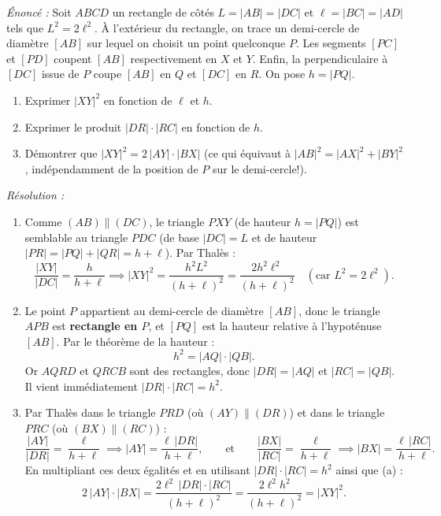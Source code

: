 \begin{exemple}
\emph{Énoncé :} Soit $ABCD$ un rectangle de côtés $L = |AB| = |DC|$ et $\ell = |BC| = |AD|$ tels que $L^2 = 2\ell^2$. À l'extérieur du rectangle, on trace un demi-cercle de diamètre $[AB]$ sur lequel on choisit un point quelconque $P$. Les segments $[PC]$ et $[PD]$ coupent $[AB]$ respectivement en $X$ et $Y$. Enfin, la perpendiculaire à $[DC]$ issue de $P$ coupe $[AB]$ en $Q$ et $[DC]$ en $R$. On pose $h = |PQ|$.
\begin{enumerate}[label=(\alph*)]
    \item Exprimer $|XY|^2$ en fonction de $\ell$ et $h$.
    \item Exprimer le produit $|DR| \cdot |RC|$ en fonction de $h$.
    \item Démontrer que $|XY|^2 = 2\,|AY|\cdot|BX|$ (ce qui équivaut à $|AB|^2 = |AX|^2 + |BY|^2$, indépendamment de la position de $P$ sur le demi-cercle!).
\end{enumerate}
\emph{Résolution :}
\begin{enumerate}[label=(\alph*)]
    \item Comme $(AB) \parallel (DC)$, le triangle $PXY$ (de hauteur $h = |PQ|$) est semblable au triangle $PDC$ (de base $|DC| = L$ et de hauteur $|PR| = |PQ| + |QR| = h + \ell$). Par Thalès :
    \[
        \frac{|XY|}{|DC|} = \frac{h}{h+\ell} \implies |XY|^2 = \frac{h^2 L^2}{(h+\ell)^2} = \boxed{\frac{2h^2\ell^2}{(h+\ell)^2}} \quad (\text{car } L^2 = 2\ell^2).
    \]
    \item Le point $P$ appartient au demi-cercle de diamètre $[AB]$, donc le triangle $APB$ est \textbf{rectangle en $P$}, et $[PQ]$ est la hauteur relative à l'hypoténuse $[AB]$. Par le théorème de la hauteur :
    \[
        h^2 = |AQ| \cdot |QB|.
    \]
    Or $AQRD$ et $QRCB$ sont des rectangles, donc $|DR| = |AQ|$ et $|RC| = |QB|$. Il vient immédiatement $|DR| \cdot |RC| = \boxed{h^2}$.
    \item Par Thalès dans le triangle $PRD$ (où $(AY) \parallel (DR)$) et dans le triangle $PRC$ (où $(BX) \parallel (RC)$) :
    \[
        \frac{|AY|}{|DR|} = \frac{\ell}{h+\ell} \implies |AY| = \frac{\ell\,|DR|}{h+\ell}, \qquad \text{et} \qquad \frac{|BX|}{|RC|} = \frac{\ell}{h+\ell} \implies |BX| = \frac{\ell\,|RC|}{h+\ell}.
    \]
    En multipliant ces deux égalités et en utilisant $|DR|\cdot|RC| = h^2$ ainsi que (a) :
    \[
        2\,|AY|\cdot|BX| = \frac{2\ell^2\,|DR|\cdot|RC|}{(h+\ell)^2} = \frac{2\ell^2 h^2}{(h+\ell)^2} = |XY|^2.
    \]
\end{enumerate}
\end{exemple}

